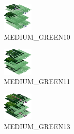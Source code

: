 \hspace{0.1cm}
\begin{minipage}[b]{0.15\linewidth}
\begin{figure}[H]                                                          
  \centering                                                             
  \begin{adjustbox}{width=1.5cm,center}                                   
  \includegraphics[width=1.5cm]{src/colorspace_colourflow/flows/colourflow_202-45.png}%
  \end{adjustbox}                                                        
\caption*{MEDIUM\_GREEN10}                                           
\end{figure}                                                               
\end{minipage}
\hspace{0.1cm}
\begin{minipage}[b]{0.15\linewidth}
\begin{figure}[H]                                                          
  \centering                                                             
  \begin{adjustbox}{width=1.5cm,center}                                   
  \includegraphics[width=1.5cm]{src/colorspace_colourflow/flows/colourflow_203-45.png}%
  \end{adjustbox}                                                        
\caption*{MEDIUM\_GREEN11}                                           
\end{figure}                                                               
\end{minipage}
\hspace{0.1cm}
\begin{minipage}[b]{0.15\linewidth}
\begin{figure}[H]                                                          
  \centering                                                             
  \begin{adjustbox}{width=1.5cm,center}                                   
  \includegraphics[width=1.5cm]{src/colorspace_colourflow/flows/colourflow_205-45.png}%
  \end{adjustbox}                                                        
\caption*{MEDIUM\_GREEN13}                                           
\end{figure}                                                               
\end{minipage}
